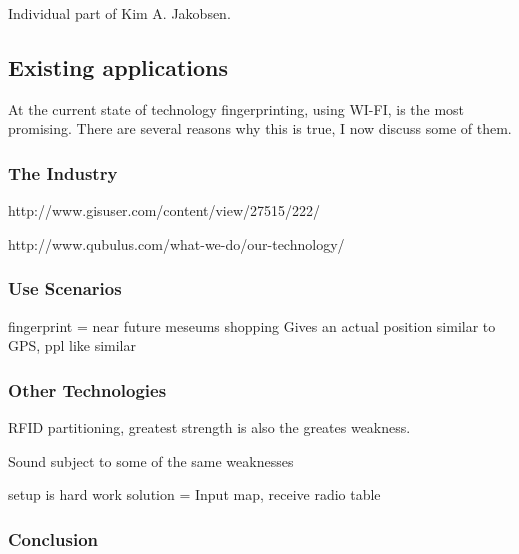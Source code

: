 Individual part of Kim A. Jakobsen.

\subsection{Existing applications}
At the current state of technology fingerprinting, using WI-FI, is the most promising.
There are several reasons why this is true, I now discuss some of them.

\subsubsection{\qquad The Industry} 
http://www.gisuser.com/content/view/27515/222/

http://www.qubulus.com/what-we-do/our-technology/


\subsubsection{\qquad Use Scenarios} 

fingerprint = near future
	meseums
	shopping
	Gives an actual position
	similar to GPS, ppl like similar

\subsubsection{\qquad Other Technologies} 

RFID
partitioning, greatest strength is also the greates weakness.


Sound
subject to some of the same weaknesses

setup is hard work
solution = Input map, receive radio table







\subsubsection{\qquad Conclusion}




